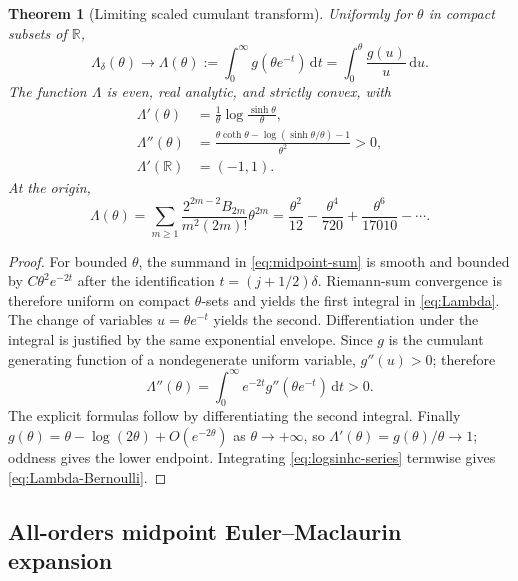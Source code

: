 \documentclass[11pt,a4paper]{article}
\newtheorem{theorem}{Theorem}[section]
\theoremstyle{definition}
\newcommand{\R}{\mathbb{R}}
\newcommand{\dd}{\,\mathrm{d}}
\newcommand{\1}{\mathbf{1}}
\begin{document}
\begin{theorem}[Limiting scaled cumulant transform]
\label{thm:lambda-limit}
Uniformly for $\theta$ in compact subsets of $\R$,
\begin{equation}
 \Lambda_\delta(\theta)\longrightarrow
 \Lambda(\theta):=\int_0^\infty g(\theta e^{-t})\dd t
 =\int_0^\theta\frac{g(u)}{u}\dd u.
 \label{eq:Lambda}
\end{equation}
The function $\Lambda$ is even, real analytic, and strictly convex, with
\begin{align}
 \Lambda'(\theta)&=\frac{1}{\theta}
    \log\frac{\sinh\theta}{\theta},
 \label{eq:Lambda-prime}\\
 \Lambda''(\theta)&=
 \frac{\theta\coth\theta-
       \log(\sinh\theta/\theta)-1}{\theta^2}>0,
 \label{eq:Lambda-second}\\
 \Lambda'(\R)&=(-1,1).
 \label{eq:gradient-range}
\end{align}
At the origin,
\begin{equation}
 \Lambda(\theta)=
 \sum_{m\ge1}
 \frac{2^{2m-2}B_{2m}}{m^2(2m)!}\theta^{2m}
 =\frac{\theta^2}{12}-\frac{\theta^4}{720}
  +\frac{\theta^6}{17010}-\cdots.
 \label{eq:Lambda-Bernoulli}
\end{equation}
\end{theorem}

\begin{proof}
For bounded $\theta$, the summand in \eqref{eq:midpoint-sum} is smooth and
bounded by $C\theta^2e^{-2t}$ after the identification
$t=(j+1/2)\delta$.  Riemann-sum convergence is therefore uniform on compact
$\theta$-sets and yields the first integral in \eqref{eq:Lambda}.  The change
of variables $u=\theta e^{-t}$ yields the second.  Differentiation under the
integral is justified by the same exponential envelope.  Since
$g$ is the cumulant generating function of a nondegenerate uniform variable,
$g''(u)>0$; therefore
\[
 \Lambda''(\theta)=\int_0^\infty e^{-2t}g''(\theta e^{-t})\dd t>0.
\]
The explicit formulas follow by differentiating the second integral.  Finally
$g(\theta)=\theta-\log(2\theta)+O(e^{-2\theta})$ as
$\theta\to+\infty$, so $\Lambda'(\theta)=g(\theta)/\theta\to1$;
oddness gives the lower endpoint.  Integrating \eqref{eq:logsinhc-series}
termwise gives \eqref{eq:Lambda-Bernoulli}.
\end{proof}

\subsection{All-orders midpoint Euler--Maclaurin expansion}
\end{document}
